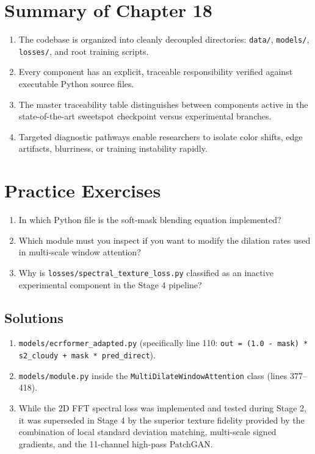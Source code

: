 \section{Summary of Chapter 18}
\begin{enumerate}
    \item The codebase is organized into cleanly decoupled directories: \texttt{data/}, \texttt{models/}, \texttt{losses/}, and root training scripts.
    \item Every component has an explicit, traceable responsibility verified against executable Python source files.
    \item The master traceability table distinguishes between components active in the state-of-the-art sweetspot checkpoint versus experimental branches.
    \item Targeted diagnostic pathways enable researchers to isolate color shifts, edge artifacts, blurriness, or training instability rapidly.
\end{enumerate}

\section{Practice Exercises}
\begin{enumerate}
    \item In which Python file is the soft-mask blending equation implemented?
    \item Which module must you inspect if you want to modify the dilation rates used in multi-scale window attention?
    \item Why is \texttt{losses/spectral\_texture\_loss.py} classified as an inactive experimental component in the Stage 4 pipeline?
\end{enumerate}

\subsection*{Solutions}
\begin{enumerate}
    \item \texttt{models/ecrformer\_adapted.py} (specifically line 110: \texttt{out = (1.0 - mask) * s2\_cloudy + mask * pred\_direct}).
    \item \texttt{models/module.py} inside the \texttt{MultiDilateWindowAttention} class (lines 377--418).
    \item While the 2D FFT spectral loss was implemented and tested during Stage 2, it was superseded in Stage 4 by the superior texture fidelity provided by the combination of local standard deviation matching, multi-scale signed gradients, and the 11-channel high-pass PatchGAN.
\end{enumerate}
